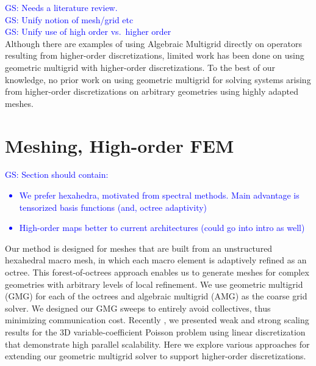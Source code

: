 \documentclass[times]{nlaauth}
\newcommand{\gsnote}[1]{\textcolor{blue}{GS: #1}}
\begin{document}
\noindent
\gsnote{Needs a literature review.}\\
\gsnote{Unify notion of mesh/grid etc}\\
\gsnote{Unify use of high order vs.\ higher order}\\
Although there are examples of using Algebraic Multigrid directly on
operators resulting from higher-order discretizations, limited work
has been done on using geometric multigrid with higher-order
discretizations. To the best of our knowledge, no prior work on using
geometric multigrid for solving systems arising from higher-order
discretizations on arbitrary geometries using highly adapted meshes.






\section{Meshing, High-order FEM}

\gsnote{Section should contain:
\begin{itemize}
\item We prefer hexahedra, motivated from spectral methods. Main
  advantage is tensorized basis functions (and, octree adaptivity)
\item High-order maps better to current architectures (could go into
  intro as well)
\end{itemize}
}

Our method is designed for meshes that are built from an unstructured
hexahedral macro mesh, in which each macro element is adaptively
refined as an octree. This forest-of-octrees approach enables us to
generate meshes for complex geometries with arbitrary levels of local
refinement. We use geometric multigrid (GMG) for each of the octrees
and algebraic multigrid (AMG) as the coarse grid solver. We designed
our GMG sweeps to entirely avoid collectives, thus minimizing
communication cost. Recently \cite{SundarBirosBursteddeEtAl12}, we
presented weak and strong scaling results for the 3D
variable-coefficient Poisson problem using linear discretization that
demonstrate high parallel scalability. Here we explore various
approaches for extending our geometric multigrid solver to support
higher-order discretizations.
\end{document}
